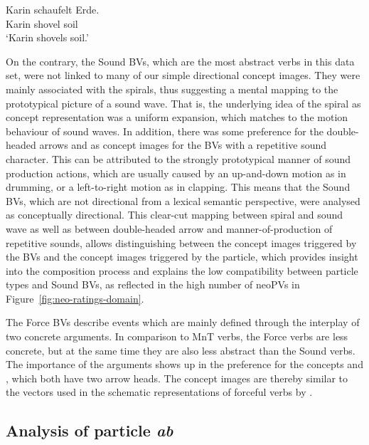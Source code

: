 \documentclass[output=paper]{langsci/langscibook}
\begin{document}
\ea\label{ex:schaufelErde} 
\gll Karin schaufelt Erde.\\ 
Karin shovel soil\\
\glt `Karin shovels soil.'
\z

On the contrary, the Sound BVs, which are the most abstract
verbs in this data set, were not linked to many of our simple
directional concept images. They were mainly associated with the spirals, thus
suggesting a mental mapping to the prototypical picture of a sound
wave. That is, the underlying idea of the spiral as concept
representation was a uniform expansion, which matches to the motion
behaviour of sound waves. In addition, there was some preference for
the double-headed arrows  and  as
concept images for the BVs with a repetitive sound character. This can be
attributed to the strongly prototypical manner of sound production
actions, which are usually caused by an up-and-down motion as in
drumming, or a left-to-right motion as in clapping. This means that
the Sound BVs, which are not directional from a lexical
semantic perspective, were analysed as conceptually directional. This
clear-cut mapping between spiral and sound wave as well as between
double-headed arrow and manner-of-production of repetitive sounds,
allows distinguishing between the concept images triggered by the BVs and the concept images
triggered by the particle, which provides insight into the composition
process and explains the low compatibility between particle types and
Sound BVs, as reflected in the high number of neoPVs in
Figure~\ref{fig:neo-ratings-domain}.

The Force BVs describe events which are mainly defined
through the interplay of two concrete arguments. In comparison to
MnT verbs, the Force verbs are less concrete, but at
the same time they are also less abstract than the Sound
verbs. The importance of the arguments shows up in the preference for
the concepts  and , which both have
two arrow heads. The concept images are thereby similar to the vectors used in
the schematic representations of forceful verbs by \cite{Zwarts:10}.

\subsection{Analysis of particle \textit{ab}}
\label{sec:disc-ab}
\end{document}
